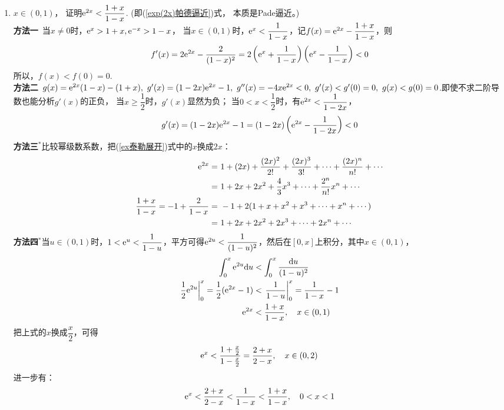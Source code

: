 \begin{enumerate}[label={【\textbf{例\thechapter.\arabic*}】},
 leftmargin=\inteval{\myenumleftmargin}pt,
 itemsep=\inteval{\myenumitempsep}pt,
 itemindent=\inteval{\myenumitemindent}pt]
\item \label{证明e^2x<(1+x)/(1-x)}  $ x\in (0,1) $，
证明$  \mathrm{e}^{2x}<\dfrac{1+x}{1-x} $. (即(\ref{exp(2x)帕德逼近})式，
本质是Pade逼近。) \\
\textbf{方法一}\ 当$ x\neq 0 $时，$ \mathrm{e}^x>1+x,\mathrm{e}^{-x}>1-x $，
当$ x \in (0, 1) $时，$ \mathrm{e}^x<\dfrac{1}{1-x} $，记$ f(x)=\mathrm{e}^{2x}-\dfrac{1+x}{1-x} $，则
\begin{align*}
    f'(x)=2\mathrm{e}^{2x}-\dfrac{2}{(1-x)^2}=
    2\left(\mathrm{e}^x+\dfrac{1}{1-x}\right)\left(\mathrm{e}^x-\dfrac{1}{1-x}\right)< 0
\end{align*}
所以，$ f(x)<f(0)=0 $. \\
\textbf{方法二}\ $ g(x)=\e^{2x}(1-x)-(1+x),\ g'(x)=(1-2x)\e^{2x}-1,\ g''(x)=-4x\e^{2x}<0,
\ g'(x)<g'(0)=0,\ g(x)<g(0)=0 $.即使不求二阶导数也能分析$ g'(x) $的正负，
当$ x\geq \dfrac{1}{2} $时，$ g'(x) $显然为负；
当$ 0< x<\dfrac{1}{2} $时，有$ \mathrm{e}^{2x}<\dfrac{1}{1-2x} $，
\begin{gather*}
    g'(x)=(1-2x)\mathrm{e}^{2x}-1=(1-2x)\left(\mathrm{e}^{2x}-\dfrac{1}{1-2x}\right)<0
\end{gather*}
\textbf{方法三}$ ^* $比较幂级数系数，把(\ref{ex泰勒展开})式中的$ x $换成$ 2x $：
\begin{align*}
    \mathrm{e}^{2x}=&\ 1+(2x)+\dfrac{(2x)^2}{2!}+\dfrac{(2x)^3}{3!}+\cdots + \dfrac{(2x)^n}{n!} +\cdots \\
     =&\ 1+2x+2x^2+\frac{4}{3}x^3+\cdots+\frac{2^n}{n!}x^n+\cdots \\
    \dfrac{1+x}{1-x}=-1+\dfrac{2}{1-x} 
    =&\ -1+2(1+x+x^2+x^3+\cdots + x^n +\cdots ) \\
    =&\ 1+2x+2x^2+2x^3+\cdots + 2x^n+\cdots 
\end{align*}
\textbf{方法四}$ ^* $当$ u \in (0,1) $时，$ 1<\mathrm{e}^u<\dfrac{1}{1-u} $，平方可得$ \mathrm{e}^{2u}<\dfrac{1}{(1-u)^2} $，然后在$ [0,x] $上积分，其中$ x\in (0,1) $，
\begin{align*}
    \int_{0}^{x}\mathrm{e}^{2u}\mathrm{d} u &<\int_{0}^{x}\dfrac{\mathrm{d} u}{(1-u)^2}\\  
    \left.\dfrac{1}{2}\mathrm{e}^{2u}\right|_0^x
    =\dfrac{1}{2}(\mathrm{e}^{2x}-1) &<\left.\dfrac{1}{1-u}
    \right|_0^x=\dfrac{1}{1-x}-1 \\
    \mathrm{e}^{2x} &<\dfrac{1+x}{1-x},	\quad x\in (0,1)
\end{align*}
把上式的$ x $换成$ \dfrac{x}{2} $，可得
\begin{gather}\label{e^x<(2+x)/(2-x)}
    \mathrm{e}^{x}<\dfrac{1+\frac{x}{2}}{1-\frac{x}{2}}=
    \dfrac{2+x}{2-x}, \quad x\in (0,2)
\end{gather}
进一步有：
\begin{gather}\label{e^x<(1+x)/(1-x)}
    \mathrm{e}^{x}<\dfrac{2+x}{2-x}<\dfrac{1}{1-x}<\dfrac{1+x}{1-x}, \quad 0<x<1
\end{gather}


\end{enumerate}
